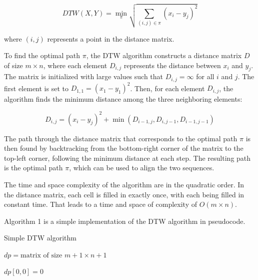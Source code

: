 \documentclass[final,rdr32.tex]{subfiles}
\begin{document}
\begin{equation*}
    DTW(X,Y) = \min_{\pi}\sqrt{\sum_{(i,j) \in \pi}(x_i - y_j)^2}
\end{equation*}

where $(i,j)$ represents a point in the distance matrix.

To find the optimal path $\pi$, the DTW algorithm constructs a distance matrix $D$ of size $m \times n$, where each element $D_{i,j}$ represents the distance between $x_i$ and $y_j$. The matrix is initialized with large values such that $D_{i,j} = \infty$ for all $i$ and $j$. The first element is set to $D_{1,1} = (x_1 - y_1)^2$. Then, for each element $D_{i,j}$, the algorithm finds the minimum distance among the three neighboring elements:

\begin{equation*}
    D_{i,j} = (x_i - y_j)^2 + \min(D_{i-1,j}, D_{i,j-1}, D_{i-1,j-1})
\end{equation*}

The path through the distance matrix that corresponds to the optimal path $\pi$ is then found by backtracking from the bottom-right corner of the matrix to the top-left corner, following the minimum distance at each step. The resulting path is the optimal path $\pi$, which can be used to align the two sequences.

The time and space complexity of the algorithm are in the quadratic order. In the distance matrix, each cell is filled in exactly once, with each being filled in constant time. That leads to a time and space of complexity of $O(m \times n)$.

\newpage

Algorithm 1 is a simple implementation of the DTW algorithm in pseudocode.

\begin{algorithm}
    \caption{Simple DTW algorithm}


    $dp = \text{matrix of size } m+1 \times n+1$

    $dp[0,0] = 0$


\end{algorithm}
\end{document}
